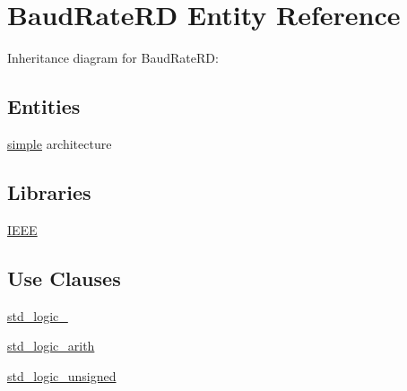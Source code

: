 \hypertarget{class_baud_rate_r_d}{}\section{Baud\+Rate\+R\+D Entity Reference}
\label{class_baud_rate_r_d}


Inheritance diagram for Baud\+Rate\+R\+D\+:
\subsection*{Entities}
\begin{DoxyCompactItemize}
\item 
\hyperlink{class_baud_rate_r_d_1_1simple}{simple} architecture
\end{DoxyCompactItemize}
\subsection*{Libraries}
 \begin{DoxyCompactItemize}
\item 
\hyperlink{class_baud_rate_r_d_ae4f03c286607f3181e16b9aa12d0c6d4}{I\+E\+E\+E} 
\end{DoxyCompactItemize}
\subsection*{Use Clauses}
 \begin{DoxyCompactItemize}
\item 
\hyperlink{class_baud_rate_r_d_acd03516902501cd1c7296a98e22c6fcb}{std\+\_\+logic\+\_}   
\item 
\hyperlink{class_baud_rate_r_d_a0f5ecc6613f63d07f7963a97b1b26095}{std\+\_\+logic\+\_\+arith}   
\item 
\hyperlink{class_baud_rate_r_d_a598da929e807d58939b47499e8bc9fa8}{std\+\_\+logic\+\_\+unsigned}   
\end{DoxyCompactItemize}

